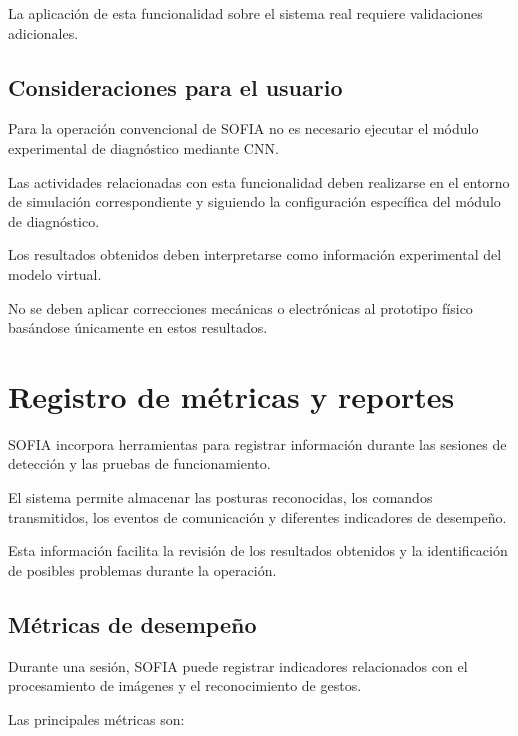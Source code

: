 \documentclass[letterpaper,journal]{IEEEtran}
\begin{document}
La aplicación de esta funcionalidad
sobre el sistema real requiere
validaciones adicionales.

\subsection{Consideraciones para el usuario}

Para la operación convencional de SOFIA
no es necesario ejecutar el módulo
experimental de diagnóstico mediante CNN.

Las actividades relacionadas con esta
funcionalidad deben realizarse en el
entorno de simulación correspondiente
y siguiendo la configuración específica
del módulo de diagnóstico.

Los resultados obtenidos deben
interpretarse como información
experimental del modelo virtual.

No se deben aplicar correcciones
mecánicas o electrónicas al prototipo
físico basándose únicamente en estos
resultados.

\section{Registro de métricas y reportes}
\label{sec:metricas_reportes}

SOFIA incorpora herramientas para registrar
información durante las sesiones de detección
y las pruebas de funcionamiento.

El sistema permite almacenar las posturas
reconocidas, los comandos transmitidos,
los eventos de comunicación y diferentes
indicadores de desempeño.

Esta información facilita la revisión
de los resultados obtenidos y la
identificación de posibles problemas
durante la operación.

\subsection{Métricas de desempeño}

Durante una sesión, SOFIA puede registrar
indicadores relacionados con el procesamiento
de imágenes y el reconocimiento de gestos.

Las principales métricas son:
\end{document}
